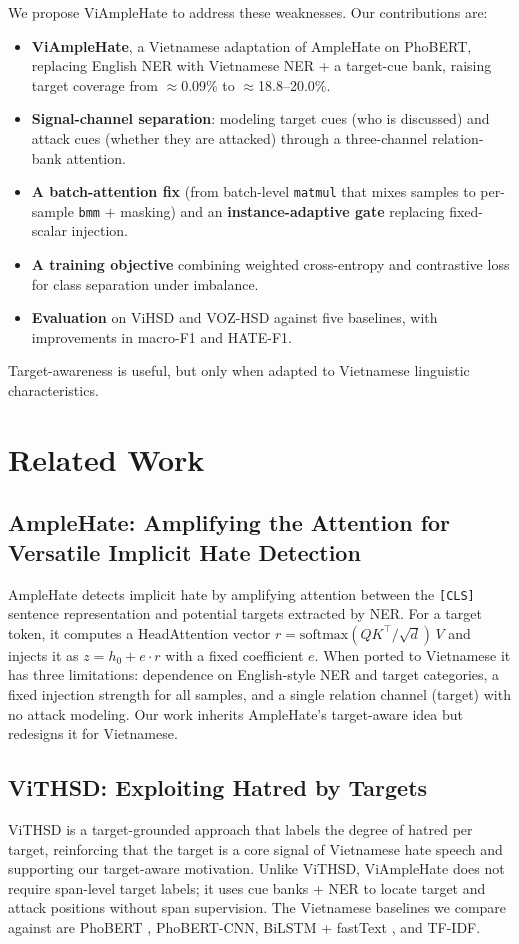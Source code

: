 \documentclass[11pt]{article}
\begin{document}
We propose ViAmpleHate to address these weaknesses. Our contributions are:
\begin{itemize}
  \item \textbf{ViAmpleHate}, a Vietnamese adaptation of AmpleHate on PhoBERT, replacing English NER with Vietnamese NER + a target-cue bank, raising target coverage from $\approx$0.09\% to $\approx$18.8--20.0\%.
  \item \textbf{Signal-channel separation}: modeling target cues (who is discussed) and attack cues (whether they are attacked) through a three-channel relation-bank attention.
  \item \textbf{A batch-attention fix} (from batch-level \texttt{matmul} that mixes samples to per-sample \texttt{bmm} + masking) and an \textbf{instance-adaptive gate} replacing fixed-scalar injection.
  \item \textbf{A training objective} combining weighted cross-entropy and contrastive loss for class separation under imbalance.
  \item \textbf{Evaluation} on ViHSD and VOZ-HSD against five baselines, with improvements in macro-F1 and HATE-F1.
\end{itemize}
Target-awareness is useful, but only when adapted to Vietnamese linguistic characteristics.

\section{Related Work}

\subsection{AmpleHate: Amplifying the Attention for Versatile Implicit Hate Detection}
AmpleHate \citep{amplehate} detects implicit hate by amplifying attention between the \texttt{[CLS]} sentence representation and potential targets extracted by NER. For a target token, it computes a HeadAttention vector $r = \mathrm{softmax}(QK^\top/\sqrt d)\,V$ and injects it as $z = h_0 + e\cdot r$ with a fixed coefficient $e$. When ported to Vietnamese it has three limitations: dependence on English-style NER and target categories, a fixed injection strength for all samples, and a single relation channel (target) with no attack modeling. Our work inherits AmpleHate's target-aware idea but redesigns it for Vietnamese.

\subsection{ViTHSD: Exploiting Hatred by Targets}
ViTHSD \citep{vithsd} is a target-grounded approach that labels the degree of hatred per target, reinforcing that the target is a core signal of Vietnamese hate speech and supporting our target-aware motivation. Unlike ViTHSD, ViAmpleHate does not require span-level target labels; it uses cue banks + NER to locate target and attack positions without span supervision. The Vietnamese baselines we compare against are PhoBERT \citep{phobert}, PhoBERT-CNN, BiLSTM + fastText \citep{fasttext}, and TF-IDF.
\end{document}
